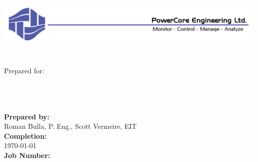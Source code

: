 \begin{titlepage}
\thispagestyle{empty}
\center %

\begin{center}
\includegraphics[height=1in, keepaspectratio=true]{Images/PCEHeader.PNG}
\end{center}

\begin{center}
\vspace{20mm}
\Huge \DocTitle \\ %
\vspace{75mm}
\large Prepared for: \\
\LARGE\textbf{\Customer} \\
\large\textbf{\Building}\\
\small\textbf{\Address}\\
\end{center}



 
\begin{flushleft} \large
\vfill

\textbf{Prepared by:} \\
Roman Bulla, P. Eng., Scott Vermeire, EIT \\
\vspace{12pt} 
\textbf{Completion:}\\
\today \\ 
\vspace{12pt} 
\textbf{Job Number:}\\
\JobNum \\
\end{flushleft}

\end{titlepage}
